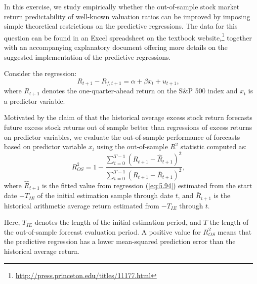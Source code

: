\documentclass[12pt]{article}
\begin{document}
In this exercise, we study empirically whether the out-of-sample stock market return predictability of well-known valuation ratios can be improved by imposing simple theoretical restrictions on the predictive regressions. The data for this question can be found in an Excel spreadsheet on the textbook website,\footnote{\url{http://press.princeton.edu/titles/11177.html}} together with an accompanying explanatory document offering more details on the suggested implementation of the predictive regressions.

Consider the regression:
\begin{equation}
    R_{t+1} - R_{f,t+1} = \alpha + \beta x_t + u_{t+1},
    \label{eq:5.94}
\end{equation}
where $R_{t+1}$ denotes the one-quarter-ahead return on the S\&P 500 index and $x_t$ is a predictor variable. 

Motivated by the claim of \textcite{WelchGoyal2008} that the historical average excess stock return forecasts future excess stock returns out of sample better than regressions of excess returns on predictor variables, we evaluate the out-of-sample performance of forecasts based on predictor variable $x_t$ using the out-of-sample $R^2$ statistic computed as:
\begin{equation}
    R^2_{OS} = 1 - 
    \frac{\sum_{t=0}^{T-1} (R_{t+1} - \hat{R}_{t+1})^2}
         {\sum_{t=0}^{T-1} (R_{t+1} - \bar{R}_{t+1})^2},
    \label{eq:5.95}
\end{equation}
where $\hat{R}_{t+1}$ is the fitted value from regression (\ref{eq:5.94}) estimated from the start date $-T_{IE}$ of the initial estimation sample through date $t$, and $\bar{R}_{t+1}$ is the historical arithmetic average return estimated from $-T_{IE}$ through $t$. 

Here, $T_{IE}$ denotes the length of the initial estimation period, and $T$ the length of the out-of-sample forecast evaluation period. A positive value for $R^2_{OS}$ means that the predictive regression has a lower mean-squared prediction error than the historical average return.
\end{document}
